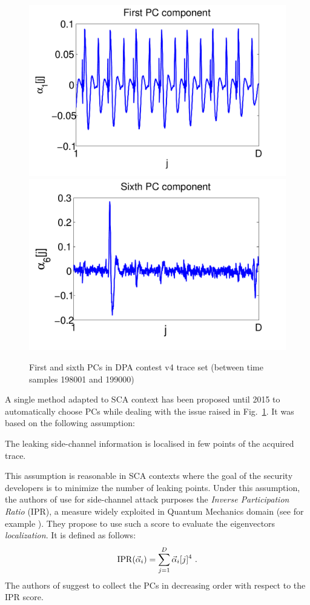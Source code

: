 \begin{figure}
\includegraphics[width=.45\textwidth]{../Figures/CARDIS2015/DPAcontestPC1_new.pdf} 
\includegraphics[width=.45\textwidth]{../Figures/CARDIS2015/DPAcontestPC6_new.pdf} 
\caption[First and sixth PCs in DPA contest v4 trace set.]{First and sixth PCs in DPA contest v4 trace set (between time samples 198001 and 199000)}\label{fig:DPAcontest}
\end{figure}
A single method adapted to SCA context has been proposed until 2015 to automatically choose PCs \cite{SCAclassProbl} while dealing with the issue raised in Fig.~\ref{fig:DPAcontest}. It was based on the following assumption:
\begin{assumption}\label{assum:local}
The leaking side-channel information is localised in few points of the acquired trace.
\end{assumption}
This assumption is reasonable in SCA contexts where the goal of the security developers is to minimize the number of leaking points.
Under this assumption, the authors of \cite{SCAclassProbl} use for side-channel attack purposes the {\em Inverse Participation Ratio} (IPR), a measure widely exploited in Quantum Mechanics domain (see for example \cite{guhr1998random}). They propose to use such a score to evaluate the eigenvectors {\em localization}. It is defined as follows:
\begin{equation}
\mathrm{IPR}(\vec{\alpha}_i) = \sum_{j=1}^D \vec{\alpha}_i[j]^4 \mbox{ .}
\end{equation}
The authors of \cite{SCAclassProbl} suggest to collect the PCs in decreasing order with respect to the IPR score.\\

